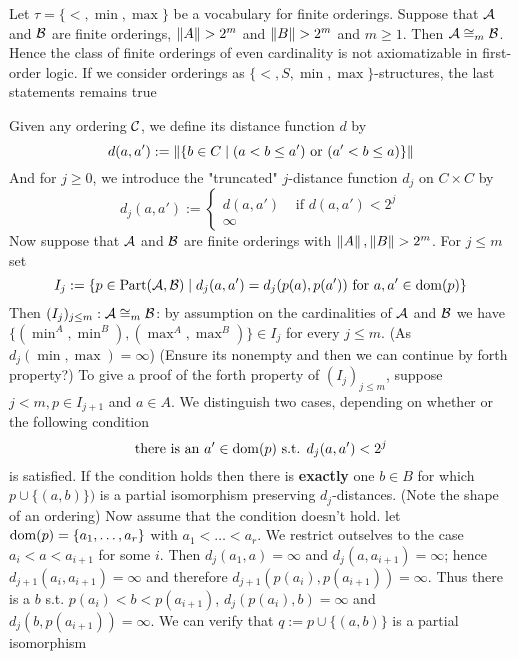 \documentclass[11pt]{article}
\def \Part {\text{Part}}
\begin{document}
\begin{examplle}[]
Let \(\tau=\{<,\min,\max\}\) be a vocabulary for finite orderings. Suppose that \(\mathcal{A}\) and
\(\mathcal{B}\) are finite orderings, \(\left\lVert A\right\rVert>2^m\) and \(\left\lVert B\right\rVert>2^m\) and \(m\ge1\). Then
\(\mathcal{A}\cong_m\mathcal{B}\). Hence the class of finite orderings of even cardinality is not
axiomatizable in first-order logic. If we consider orderings as \(\{<,S,\min,\max\}\)-structures,
the last statements remains true

Given any ordering \(\mathcal{C}\), we define its distance function \(d\) by
\begin{equation*}
d(a,a'):=\left\lVert\{b\in C\mid(a<b\le a')\text{ or }(a'<b\le a)\}\right\rVert
\end{equation*}
And for \(j\ge0\), we introduce the "truncated" \(j\)-distance function \(d_j\) on \(C\times C\)
by
\begin{equation*}
d_j(a,a'):=
\begin{cases}
d(a,a')&\text{ if }d(a,a')<2^j\\
\infty
\end{cases}
\end{equation*}
Now suppose that \(\mathcal{A}\) and \(\mathcal{B}\) are finite orderings with \(\left\lVert A\right\rVert,\left\lVert B\right\rVert>2^m\). For
\(j\le m\) set
\begin{equation*}
I_j:=\{p\in\Part(\cala,\calb)\mid d_j(a,a')=d_j(p(a),p(a'))\text{ for }a,a'\in\dom(p)\}
\end{equation*}
Then \((I_j)_{j\le m}:\mathcal{A}\cong_m\mathcal{B}\): by assumption on the cardinalities of \(\mathcal{A}\) and
\(\mathcal{B}\) we have \(\{(\min^A,\min^B),(\max^A,\max^B)\}\in I_j\) for every \(j\le m\).
(As \(d_j(\min,\max)=\infty\)) 
(Ensure its nonempty and then we can continue by forth property?)
To give a
proof of the forth property of \((I_j)_{j\le m}\), suppose \(j<m,p\in I_{j+1}\) and \(a\in A\).
We distinguish two cases, depending on whether or the following condition
\begin{equation*}
\text{there is an }a'\in\operatorname{dom}(p)\text{ s.t. }d_j(a,a')<2^j
\end{equation*}
is satisfied. If the condition holds then there is \textbf{exactly} one \(b\in B\) for which
\(p\cup\{(a,b)\})\) is a partial isomorphism preserving \(d_j\)-distances.
(Note the shape of an ordering)
Now assume that the
condition doesn't hold. let \(\operatorname{dom}(p)=\{a_1,\dots,a_r\}\) with \(a_1<\dots<a_r\). We restrict
outselves to the case \(a_i<a<a_{i+1}\) for some \(i\). Then \(d_j(a_1,a)=\infty\) and
\(d_j(a,a_{i+1})=\infty\); hence \(d_{j+1}(a_i,a_{i+1})=\infty\) and therefore
\(d_{j+1}(p(a_i),p(a_{i+1}))=\infty\). Thus there is a \(b\) s.t. \(p(a_i)<b<p(a_{i+1})\),
\(d_j(p(a_i),b)=\infty\) and \(d_j(b,p(a_{i+1}))=\infty\). We can verify that
\(q:=p\cup\{(a,b)\}\) is a partial isomorphism
\end{examplle}
\end{document}
